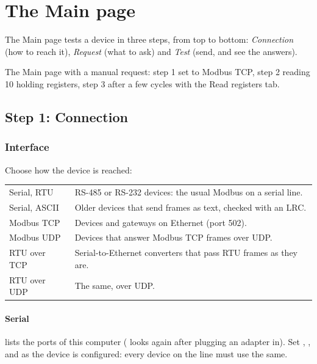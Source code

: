 \chapter{The Main page}
\label{ch:main}

The Main page tests a device in three steps, from top to bottom:
\emph{Connection} (how to reach it), \emph{Request} (what to ask) and
\emph{Test} (send, and see the answers).

  {The Main page with a manual request: step 1 set to Modbus TCP, step 2 reading
   10 holding registers, step 3 after a few cycles with the Read registers tab.}

\section{Step 1: Connection}

\subsection{Interface}

Choose how the device is reached:

\begin{center}
\begin{tabularx}{\linewidth}{l L}
  \toprule
   &  \\
  \midrule
  Serial, RTU & RS-485 or RS-232 devices: the usual Modbus on a serial line. \\
  Serial, ASCII & Older devices that send frames as text, checked with an LRC. \\
  Modbus TCP & Devices and gateways on Ethernet (port 502). \\
  Modbus UDP & Devices that answer Modbus TCP frames over UDP. \\
  RTU over TCP & Serial-to-Ethernet converters that pass RTU frames as they are. \\
  RTU over UDP & The same, over UDP. \\
  \bottomrule
\end{tabularx}
\end{center}

\subsubsection{Serial}

 lists the ports of this computer ( looks again
after plugging an adapter in). Set , ,
 and  as the device is configured: every device
on the line must use the same.

